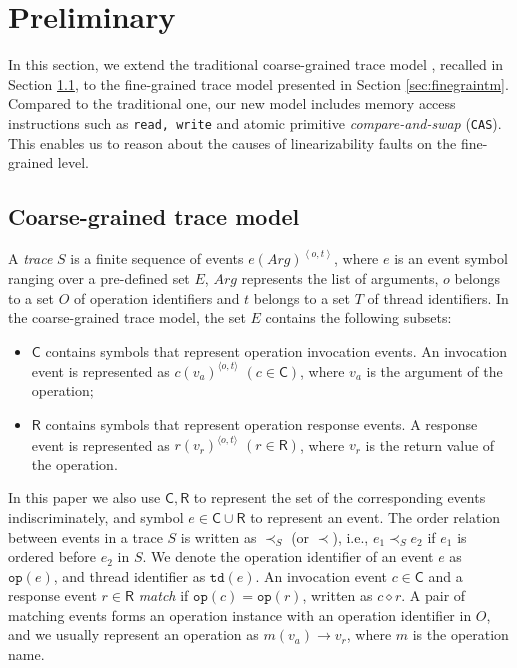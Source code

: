 \documentclass[runningheads]{llncs}
\newcommand{\ecall}{\mathsf{C}}
\newcommand{\eresp}{\mathsf{R}}
\begin{document}
\section{Preliminary}\label{sec:fgtracemodel}


In this section, we extend the traditional coarse-grained trace model \cite{DBLP:conf/popl/BouajjaniEEH15}, recalled in Section \ref{sec:coarsegraintm}, to the fine-grained trace model presented in Section \ref{sec:finegraintm}. Compared to the traditional one, our new model includes memory access instructions such as \texttt{read, write} and atomic primitive \textit{compare-and-swap} (\texttt{CAS}). This enables us to reason about the causes of linearizability faults on the fine-grained level.

\subsection{Coarse-grained trace model}\label{sec:coarsegraintm}
A \textit{trace} $S$ is a finite sequence of events $e(\mathit{Arg})^{\left\langle o,t\right\rangle}$, where $e$ is an event symbol ranging over a pre-defined set $E$, $\mathit{Arg}$ represents the list of arguments, $o$ belongs to a set $O$ of operation identifiers and $t$ belongs to a set $T$ of thread identifiers. In the coarse-grained trace model, the set $E$ contains the following subsets:
\begin{itemize}
  \item $\ecall$ contains symbols that represent operation invocation events. An invocation event is represented as $c(v_a)^{\langle o,t\rangle}$ $(c\in \ecall)$, where $v_a$ is the argument of the operation;
  \item $\eresp$ contains symbols that represent operation response events. A response event is represented as $r(v_r)^{\langle o,t\rangle}$ $(r\in \eresp)$, where $v_r$ is the return value of the operation.
\end{itemize}
\noindent In this paper we also use $\ecall, \eresp$ to represent the set of the corresponding events indiscriminately, and symbol $e\in \ecall\cup \eresp$ to represent an event. The order relation between events in a trace $S$ is written as $\prec_S$ (or $\prec$), i.e., $e_1\prec_S e_2$ if $e_1$ is ordered before $e_2$ in $S$. We denote the operation identifier of an event $e$ as $\mathtt{op}(e)$, and thread identifier as $\mathtt{td}(e)$. An invocation event $c\in \ecall$ and a response event $r\in \eresp$ \textit{match} if $\mathtt{op}(c) = \mathtt{op}(r)$, written as $c\diamond r$. A pair of matching events forms an operation instance with an operation identifier in $O$, and we usually represent an operation as $m(v_a)\to v_r$, where $m$ is the operation name.
 
\end{document}

